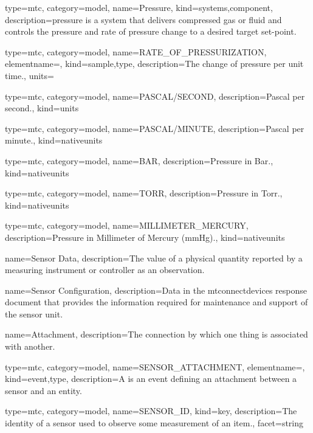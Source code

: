 {
  type=mtc,
  category=model,
  name={Pressure},
  kind={systems,component},
  description={\gls{pressure} is a system that delivers compressed gas or fluid and controls the pressure and rate of pressure change to a desired target set-point.}
}

{
  type=mtc,
  category=model,
  name={RATE\_OF\_PRESSURIZATION},
  elementname=,
  kind={sample,type},
  description={The change of pressure per unit time.},
  units=
}

{
  type=mtc,
  category=model,
  name={PASCAL/SECOND},
  description={Pascal per second.},
  kind={units}
}

{
  type=mtc,
  category=model,
  name={PASCAL/MINUTE},
  description={Pascal per minute.},
  kind={nativeunits}
}

{
  type=mtc,
  category=model,
  name={BAR},
  description={Pressure in Bar.},
  kind={nativeunits}
}

{
  type=mtc,
  category=model,
  name={TORR},
  description={Pressure in Torr.},
  kind={nativeunits}
}

{
  type=mtc,
  category=model,
  name={MILLIMETER\_MERCURY},
  description={Pressure in Millimeter of Mercury (mmHg).},
  kind={nativeunits}
}

{
  name={Sensor Data},
  description={The value of a physical quantity reported by a measuring instrument or controller as an \gls{observation}.}
}

{
  name={Sensor Configuration},
  description={Data in the \gls{mtconnectdevices response document} that provides the information required for maintenance and support of the \gls{sensor unit}.}
}

{
  name={Attachment},
  description={The connection by which one thing is associated with another.}
}

{
  type=mtc,
  category=model,
  name={SENSOR\_ATTACHMENT},
  elementname=,
  kind={event,type},
  description={A  is an \gls{event} defining an \gls{attachment} between a sensor and an entity.}
}


{
  type=mtc,
  category=model,
  name={SENSOR\_ID},
  kind={key},
  description={The identity of a sensor used to observe some measurement of an item.},
  facet={\gls{string}}
}

